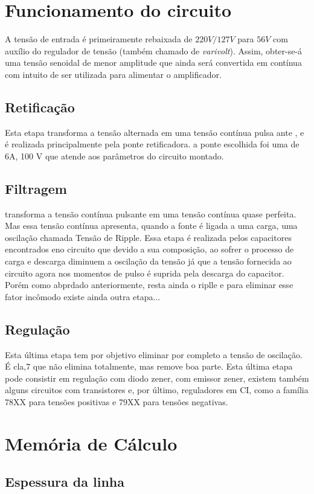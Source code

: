 \documentclass[a4paper,12pt,oneside,openany,table,xcdraw]{article}
\begin{document}
\newpage
\section{Funcionamento do circuito}
A tensão de entrada é primeiramente rebaixada de $220V/127V$ para $56V$ com auxílio do regulador de tensão (também chamado de \emph{varivolt}). Assim, obter-se-á uma tensão senoidal de menor amplitude que ainda será convertida em contínua com intuito de ser utilizada para alimentar o amplificador.

\subsection{Retificação}
Esta etapa transforma a tensão alternada em uma tensão contínua pulsa ante
, e é realizada principalmente pela ponte retificadora. a ponte escolhida foi uma de 6A, 100 V que atende aos parâmetros do  circuito montado.
\subsection{Filtragem}
transforma a tensão contínua pulsante em uma tensão contínua quase perfeita. Mas essa tensão contínua apresenta, quando a fonte é ligada a uma carga, uma oscilação chamada Tensão de Ripple. Essa etapa é realizada pelos capacitores encontrados eno circuito que devido a sua composição, ao sofrer o processo de carga e descarga diminuem a oscilação da tensão já que a tensão fornecida ao circuito agora nos momentos de pulso é suprida pela descarga do capacitor. Porém como abprdado anteriormente, resta ainda o riplle e para eliminar esse fator incômodo existe ainda outra etapa...

\subsection{Regulação}
Esta última etapa tem por objetivo eliminar por completo a tensão de oscilação.  É cla,7 que não elimina totalmente, mas remove boa parte. Esta última etapa pode consistir em regulação com diodo zener, com emissor zener, existem também alguns circuitos com transistores e, por último, reguladores em CI, como a família 78XX para tensões positivas e 79XX para tensões negativas.

\newpage
\section{Memória de Cálculo}

\subsection{Espessura da linha}
\end{document}
